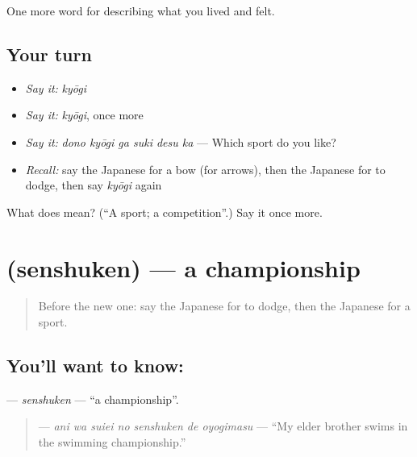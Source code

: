 \begin{grammarlens}[title={What you've built}]
One more word for describing what you lived and felt.
\end{grammarlens}

\subsection*{Your turn}
\begin{itemize}
\raggedright
  \item \emph{Say it:} \emph{kyōgi}
  \item \emph{Say it:} \emph{kyōgi}, once more
  \item \emph{Say it:} \emph{dono kyōgi ga suki desu ka} — Which sport do you like?
  \item \emph{Recall:} say the Japanese for a bow (for arrows), then the Japanese for to dodge, then say \emph{kyōgi} again
\end{itemize}

\begin{tcolorbox}[breakable,colback=teal!4,colframe=teal!35!black,title={Before you move on}]
What does  mean? (\textquotedblleft{}A sport; a competition\textquotedblright{}.) Say it once more.
\end{tcolorbox}
\section[\texorpdfstring{\ja{せんしゅけん} (senshuken)}{せんしゅけん (senshuken)}]{ (senshuken) — a championship}

\label{lesson:JA-C506-senshuken}



\begin{quote}
Before the new one: say the Japanese for to dodge, then the Japanese for a sport.
\end{quote}

\subsection*{You'll want to know: }
\textbf{} — \emph{senshuken} — \textquotedblleft{}a championship\textquotedblright{}.

\begin{quote}
\textbf{   } — \emph{ani wa suiei no senshuken de oyogimasu} — \textquotedblleft{}My elder brother swims in the swimming championship.\textquotedblright{}
\end{quote}

